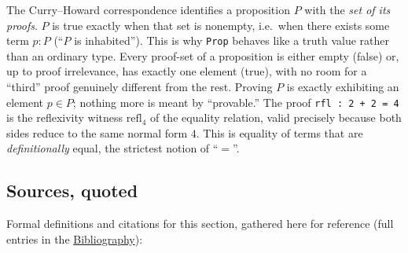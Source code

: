 \begin{mathreading}

The Curry--Howard correspondence identifies a proposition \(P\) with the \emph{set of its proofs}. \(P\) is true exactly when that set is nonempty, i.e.~when there exists some term \(p : P\) (``\(P\) is inhabited''). This is why \texttt{Prop} behaves like a truth value rather than an ordinary type. Every proof-set of a proposition is either empty (false) or, up to proof irrelevance, has exactly one element (true), with no room for a ``third'' proof genuinely different from the rest. Proving \(P\) is exactly exhibiting an element \(p \in P\); nothing more is meant by ``provable.'' The proof \texttt{rfl : 2 + 2 = 4} is the reflexivity witness \(\mathrm{refl}_4\) of the equality relation, valid precisely because both sides reduce to the same normal form \(4\). This is equality of terms that are \emph{definitionally} equal, the strictest notion of ``\(=\)''.

\end{mathreading}

\subsection{Sources, quoted}\label{sec:03-propositions-and-proofs:01-prop:3}

Formal definitions and citations for this section, gathered here for reference (full entries in the \hyperref[sec:root:bibliography:1]{Bibliography}):

